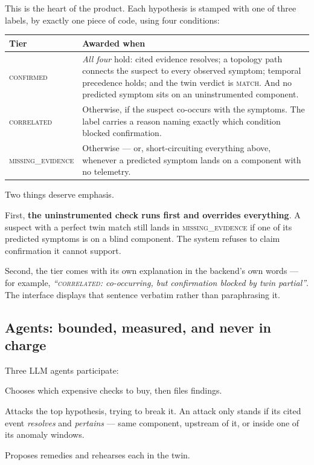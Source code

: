 \documentclass[11pt,a4paper]{article}
\begin{document}
This is the heart of the product. Each hypothesis is stamped with one of three
labels, by exactly one piece of code, using four conditions:

\begin{center}
\footnotesize
\begin{tabular}{@{}l p{10.2cm}@{}}
\toprule
\textbf{Tier} & \textbf{Awarded when} \\
\midrule
\textsc{confirmed} & \emph{All four} hold: cited evidence resolves; a topology path
connects the suspect to every observed symptom; temporal precedence holds; and the
twin verdict is \textsc{match}. And no predicted symptom sits on an uninstrumented
component. \\
\textsc{correlated} & Otherwise, if the suspect co-occurs with the symptoms. The
label carries a reason naming exactly which condition blocked confirmation. \\
\textsc{missing\_evidence} & Otherwise --- or, short-circuiting everything above,
whenever a predicted symptom lands on a component with no telemetry. \\
\bottomrule
\end{tabular}
\end{center}

Two things deserve emphasis.

First, \textbf{the uninstrumented check runs first and overrides everything}. A
suspect with a perfect twin match still lands in \textsc{missing\_evidence} if
one of its predicted symptoms is on a blind component. The system refuses to
claim confirmation it cannot support.

Second, the tier comes with its own explanation in the backend's own words ---
for example, \emph{``\textsc{correlated}: co-occurring, but confirmation blocked
by twin partial''}. The interface displays that sentence verbatim rather than
paraphrasing it.

\subsection{Agents: bounded, measured, and never in charge}

Three LLM agents participate:

\begin{description}[leftmargin=1.4em, style=nextline]
  \item[Investigator] Chooses which expensive checks to buy, then files findings.
  \item[Challenger] Attacks the top hypothesis, trying to break it. An attack only
  stands if its cited event \emph{resolves} and \emph{pertains} --- same component,
  upstream of it, or inside one of its anomaly windows.
  \item[Fix-Rehearsal] Proposes remedies and rehearses each in the twin.
\end{description}
\end{document}
